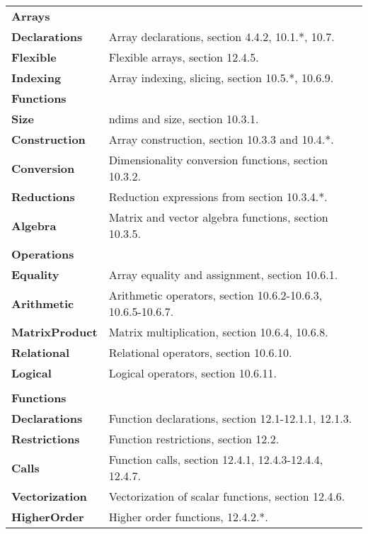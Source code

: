 \documentclass{article}
\begin{document}
\begin{tabular}{l l}
  \textbf{Arrays} \\
    \indent\textbf{Declarations}     & Array declarations, section 4.4.2, 10.1.*, 10.7. \\
    \indent\textbf{Flexible}         & Flexible arrays, section 12.4.5. \\
    \indent\textbf{Indexing}         & Array indexing, slicing, section 10.5.*, 10.6.9. \\
    \indent\textbf{Functions} \\
    \indent\indent\textbf{Size}      & ndims and size, section 10.3.1. \\
    \indent\indent\textbf{Construction} & Array construction, section 10.3.3 and 10.4.*. \\
    \indent\indent\textbf{Conversion}& Dimensionality conversion functions, section 10.3.2. \\
    \indent\indent\textbf{Reductions}& Reduction expressions from section 10.3.4.*. \\
    \indent\indent\textbf{Algebra}   & Matrix and vector algebra functions, section 10.3.5. \\
    \indent\textbf{Operations} \\
    \indent\indent\textbf{Equality}  & Array equality and assignment, section 10.6.1. \\
    \indent\indent\textbf{Arithmetic}& Arithmetic operators, section 10.6.2-10.6.3, 10.6.5-10.6.7. \\
    \indent\indent\textbf{MatrixProduct}& Matrix multiplication, section 10.6.4, 10.6.8.  \\
    \indent\indent\textbf{Relational}& Relational operators, section 10.6.10. \\
    \indent\indent\textbf{Logical}   & Logical operators, section 10.6.11. \\
  \\
  \textbf{Functions} \\
    \indent\textbf{Declarations}     & Function declarations, section 12.1-12.1.1, 12.1.3. \\
    \indent\textbf{Restrictions}     & Function restrictions, section 12.2. \\
    \indent\textbf{Calls}            & Function calls, section 12.4.1, 12.4.3-12.4.4, 12.4.7. \\
    \indent\indent\textbf{Vectorization}& Vectorization of scalar functions, section 12.4.6. \\
    \indent\textbf{HigherOrder}      & Higher order functions, 12.4.2.*. \\

\end{tabular}
\end{document}
